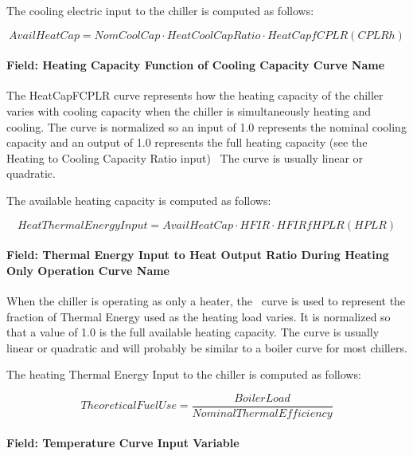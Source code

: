 The cooling electric input to the chiller is computed as follows:

\begin{equation}
    AvailHeatCap = NomCoolCap \cdot HeatCoolCapRatio \cdot HeatCapfCPLR(CPLRh)
\end{equation}

\paragraph{Field: Heating Capacity Function of Cooling Capacity Curve Name}\label{field-heating-capacity-function-of-cooling-capacity-curve-name-1}

The HeatCapFCPLR curve represents how the heating capacity of the chiller varies with cooling capacity when the chiller is simultaneously heating and cooling. The curve is normalized so an input of 1.0 represents the nominal cooling capacity and an output of 1.0 represents the full heating capacity (see the Heating to Cooling Capacity Ratio input)~ The curve is usually linear or quadratic.

The available heating capacity is computed as follows:

\begin{equation}
    HeatThermalEnergyInput = AvailHeatCap \cdot HFIR \cdot HFIRfHPLR(HPLR)
\end{equation}

\paragraph{Field: Thermal Energy Input to Heat Output Ratio During Heating Only Operation Curve Name}\label{field-thermal-energy-input-to-heat-output-ratio-during-heating-only-operation-curve-name}

When the chiller is operating as only a heater, the~ curve is used to represent the fraction of Thermal Energy used as the heating load varies. It is normalized so that a value of 1.0 is the full available heating capacity. The curve is usually linear or quadratic and will probably be similar to a boiler curve for most chillers.

The heating Thermal Energy Input to the chiller is computed as follows:

\begin{equation}
    TheoreticalFuelUse = \frac{{BoilerLoad}}{{NominalThermalEfficiency}}
\end{equation}

\paragraph{Field: Temperature Curve Input Variable}\label{field-temperature-curve-input-variable-1}

